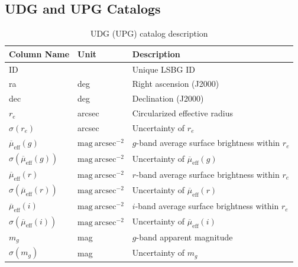 \documentclass[twocolumn,astrosymb,twocolappendix]{aastex631}
\newcommand{\sbunit}{\mathrm{mag\ arcsec}^{-2}}
\begin{document}
\begin{CJK*}{UTF8}{gbsn}



\section{UDG and UPG Catalogs}
\onecolumngrid 

\begin{table}
\caption{UDG (UPG) catalog description} 
\label{tab:catalog}
\begin{center}
\begin{tabular}{l l l}
\hline\hline
Column Name      & Unit    & Description                    \\
\hline
ID                       &         & Unique LSBG ID \\
ra                       & deg     & Right ascension (J2000) \\
dec                      & deg     & Declination (J2000) \\
$r_e$         & arcsec  & Circularized effective radius  \\
$\sigma(r_e)$ & arcsec  & Uncertainty of $r_e$ \\
$\overline{\mu}_{\mathrm{eff}}(g)$               & $\sbunit$ & $g$-band average surface brightness within $r_e$ \\
$\sigma(\overline{\mu}_{\mathrm{eff}}(g))$       & $\sbunit$ & Uncertainty of $\overline{\mu}_{\mathrm{eff}}(g)$           \\
$\overline{\mu}_{\mathrm{eff}}(r)$               & $\sbunit$ & $r$-band average surface brightness within $r_e$ \\
$\sigma(\overline{\mu}_{\mathrm{eff}}(r))$       & $\sbunit$ & Uncertainty of $\overline{\mu}_{\mathrm{eff}}(r)$           \\
$\overline{\mu}_{\mathrm{eff}}(i)$               & $\sbunit$ & $i$-band average surface brightness within $r_e$ \\
$\sigma(\overline{\mu}_{\mathrm{eff}}(i))$       & $\sbunit$ & Uncertainty of $\overline{\mu}_{\mathrm{eff}}(i)$           \\
$m_g$                    & mag     & $g$-band apparent magnitude     \\
$\sigma(m_g)$            & mag     & Uncertainty of $m_g$            \\

\end{tabular}
\end{center}
\end{table}
\end{CJK*}
\end{document}
